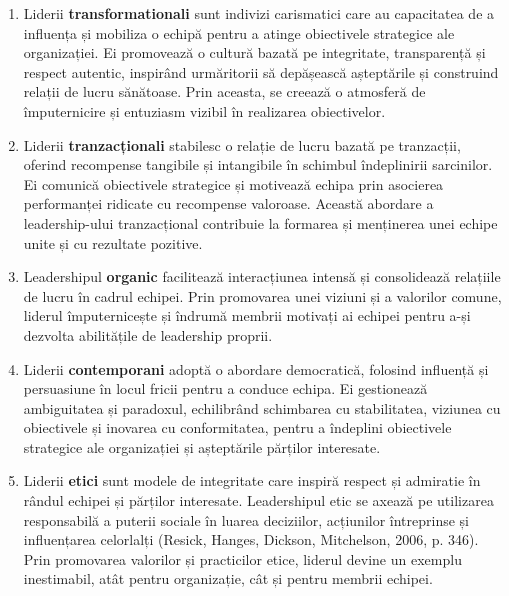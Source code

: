 \documentclass[a4paper, 12pt]{article}
\begin{document}
	\begin{enumerate}[(1)]

		\item Liderii \textbf {transformationali}  sunt indivizi carismatici care au capacitatea de a influența și mobiliza o echipă pentru a atinge obiectivele strategice ale organizației. Ei promovează o cultură bazată pe integritate, transparență și respect autentic, inspirând urmăritorii să depășească așteptările și construind relații de lucru sănătoase. Prin aceasta, se creează o atmosferă de împuternicire și entuziasm vizibil în realizarea obiectivelor.

		\item Liderii \textbf {tranzacționali} stabilesc o relație de lucru bazată pe tranzacții, oferind recompense tangibile și intangibile în schimbul îndeplinirii sarcinilor. Ei comunică obiectivele strategice și motivează echipa prin asocierea performanței ridicate cu recompense valoroase. Această abordare a leadership-ului tranzacțional contribuie la formarea și menținerea unei echipe unite și cu rezultate pozitive.

		\item Leadershipul \textbf {organic} facilitează interacțiunea intensă și consolidează relațiile de lucru în cadrul echipei. Prin promovarea unei viziuni și a valorilor comune, liderul împuternicește și îndrumă membrii motivați ai echipei pentru a-și dezvolta abilitățile de leadership proprii.
		
		\item Liderii \textbf{contemporani}  adoptă o abordare democratică, folosind influență și persuasiune în locul fricii pentru a conduce echipa. Ei gestionează ambiguitatea și paradoxul, echilibrând schimbarea cu stabilitatea, viziunea cu obiectivele și inovarea cu conformitatea, pentru a îndeplini obiectivele strategice ale organizației și așteptările părților interesate.

		\item Liderii \textbf{etici} sunt modele de integritate care inspiră respect și admiratie în rândul echipei și părților interesate. Leadershipul etic se axează pe utilizarea responsabilă a puterii sociale în luarea deciziilor, acțiunilor întreprinse și influențarea celorlalți (Resick, Hanges, Dickson, Mitchelson, 2006, p. 346). Prin promovarea valorilor și practicilor etice, liderul devine un exemplu inestimabil, atât pentru organizație, cât și pentru membrii echipei.

	\end{enumerate}
\end{document}
